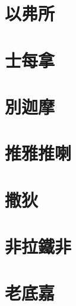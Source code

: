 \section{以弗所}

\section{士每拿}

\section{別迦摩}

\section{推雅推喇}


\section{撒狄}


\section{非拉鐵非}


\section{老底嘉}




